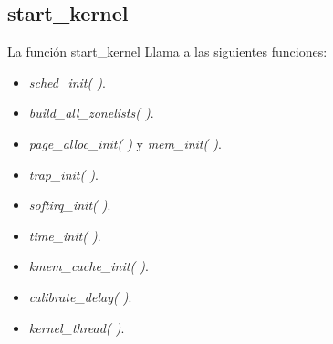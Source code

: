 \subsection{start\_kernel}
\begin{frame}{La función start\_kernel}
	Llama a las siguientes funciones:
	\begin{itemize}
		\item \emph{sched\_init( )}.
		\item \emph{build\_all\_zonelists( )}.
		\item \emph{page\_alloc\_init( )} y \emph{mem\_init( )}.
		\item \emph{trap\_init( )}.
		\item \emph{softirq\_init( )}.
		\item \emph{time\_init( )}.
		\item \emph{kmem\_cache\_init( )}.
		\item \emph{calibrate\_delay( )}.
		\item \emph{kernel\_thread( )}.
	\end{itemize}
\end{frame}

